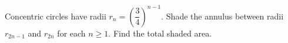 Concentric circles have radii $ r_n=(\dfrac{3}{4})^{n-1}$. Shade the annulus between radii $ r_{2n-1}$ and $ r_{2n}$ for each $ n\ge1 $. Find the total shaded area.
